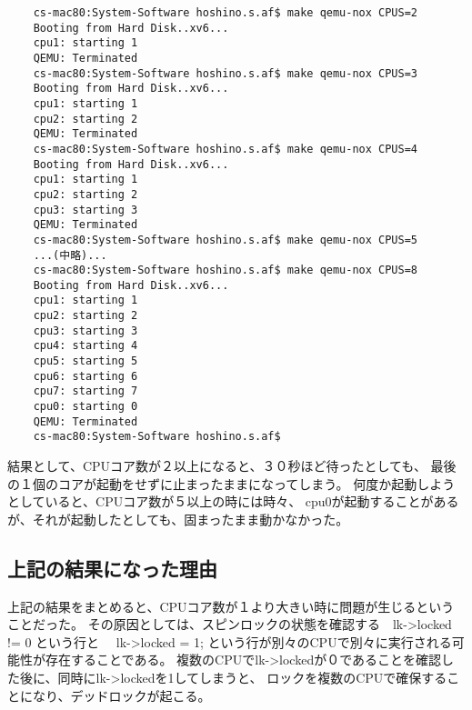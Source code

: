 \documentclass[10pt,a4j]{jarticle}
\begin{document}

\begin{screen}
  \begin{verbatim}
    cs-mac80:System-Software hoshino.s.af$ make qemu-nox CPUS=2
    Booting from Hard Disk..xv6...
    cpu1: starting 1
    QEMU: Terminated
    cs-mac80:System-Software hoshino.s.af$ make qemu-nox CPUS=3
    Booting from Hard Disk..xv6...
    cpu1: starting 1
    cpu2: starting 2
    QEMU: Terminated
    cs-mac80:System-Software hoshino.s.af$ make qemu-nox CPUS=4
    Booting from Hard Disk..xv6...
    cpu1: starting 1
    cpu2: starting 2
    cpu3: starting 3
    QEMU: Terminated
    cs-mac80:System-Software hoshino.s.af$ make qemu-nox CPUS=5
    ...(中略)...
    cs-mac80:System-Software hoshino.s.af$ make qemu-nox CPUS=8
    Booting from Hard Disk..xv6...
    cpu1: starting 1
    cpu2: starting 2
    cpu3: starting 3
    cpu4: starting 4
    cpu5: starting 5
    cpu6: starting 6
    cpu7: starting 7
    cpu0: starting 0
    QEMU: Terminated
    cs-mac80:System-Software hoshino.s.af$
  \end{verbatim}
\end{screen}

結果として、CPUコア数が２以上になると、３０秒ほど待ったとしても、
最後の１個のコアが起動をせずに止まったままになってしまう。
何度か起動しようとしていると、CPUコア数が５以上の時には時々、
cpu0が起動することがあるが、それが起動したとしても、固まったまま動かなかった。

\subsection{上記の結果になった理由}


上記の結果をまとめると、CPUコア数が１より大きい時に問題が生じるということだった。
その原因としては、スピンロックの状態を確認する　lk->locked != 0 という行と
　lk->locked = 1; という行が別々のCPUで別々に実行される可能性が存在することである。
複数のCPUでlk->lockedが０であることを確認した後に、同時にlk->lockedを1してしまうと、
ロックを複数のCPUで確保することになり、デッドロックが起こる。
\end{document}
